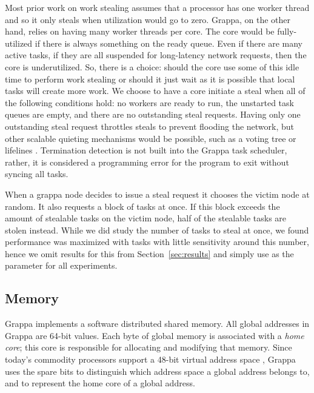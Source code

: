 Most prior work on work stealing assumes that a processor has one worker
thread and so it only steals when utilization would go to zero. Grappa,
on the other hand, relies on having many worker threads per core. The
core would be fully-utilized if there is always something on the ready
queue. Even if there are many active tasks, if they are all suspended
for long-latency network requests, then the core is underutilized. So,
there is a choice: should the core use some of this idle time to perform
work stealing or should it just wait as it is possible that local tasks
will create more work. We choose to have a core initiate a steal when
all of the following conditions hold: no workers are ready to run, the
unstarted task queues are empty, and there are no outstanding steal
requests. Having only one outstanding steal request throttles steals to
prevent flooding the network, but other scalable quieting mechanisms
would be possible, such as a voting
tree\cite{scalableWorkStealingOrCilk98} or lifelines \cite{lifelines}.
Termination detection is not built into the Grappa task scheduler,
rather, it is considered a programming error for the program to exit
without syncing all tasks.


When a grappa node decides to issue a steal request it chooses the
victim node at random.  It also requests a block of tasks at once.  If
this block exceeds the amount of stealable tasks on the victim node,
half of the stealable tasks are stolen instead.  While we did study the
number of tasks to steal at once, we found performance was maximized
with  tasks with little sensitivity around this number,
hence we omit results for this from Section~\ref{sec:results} and simply
use  as the parameter for all experiments.


\subsection{Memory}


Grappa implements a software distributed shared memory. All global
addresses in Grappa are 64-bit values. Each byte of global memory is
associated with a {\em home core}; this core is responsible for
allocating and modifying that memory. Since today's commodity processors
support a 48-bit virtual address space \cite{AMD64}, Grappa uses the
spare bits to distinguish which address space a global address belongs
to, and to represent the home core of a global address.

